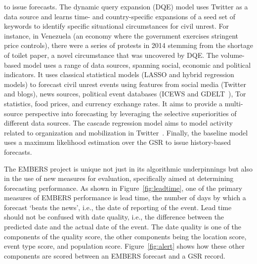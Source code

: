 to issue forecasts. The dynamic query expansion (DQE) model uses Twitter as a data source and learns time- and country-specific
expansions of a seed set of keywords to identify specific situational circumstances for civil unrest.
For instance, in Venezuela (an economy where the government exercises stringent price controls),
there were a series of protests in 2014 stemming from the shortage of toilet paper, a novel circumstance
that was uncovered by DQE. The volume-based model uses a range of data sources, spanning
social, economic
and political indicators. It uses classical statistical models (LASSO
and hybrid regression models) to forecast civil unrest events using features
from social media (Twitter and blogs), news sources,
political event databases (ICEWS and GDELT~\cite{gdelt}), Tor~\cite{tor} statistics, food prices, and currency
exchange rates. It aims to provide a multi-source perspective into forecasting by leveraging
the selective superiorities of different data sources.  The cascade regression model
aims to model activity related to organization and mobilization in Twitter~\cite{anil-plosone}.
Finally, the baseline model uses a maximum likelihood
estimation over the GSR to issue history-based forecasts.

The EMBERS project is unique not just in its algorithmic underpinnings but also in the use of new measures
for evaluation, specifically aimed at determining forecasting performance. As
shown in Figure~\ref{fig:leadtime},
one of the primary measures of EMBERS performance is lead time, the number of days by which a forecast
`beats the news', i.e., the date of reporting of the event. Lead time should not be confused with
date quality, i.e., the difference between the predicted date and the actual date of the event. The date
quality is one of the components of the quality score, the other components being the
location score, event type score, and population score.
Figure~\ref{fig:alert} 
shows how these other
components are scored between an EMBERS forecast and a GSR record.

